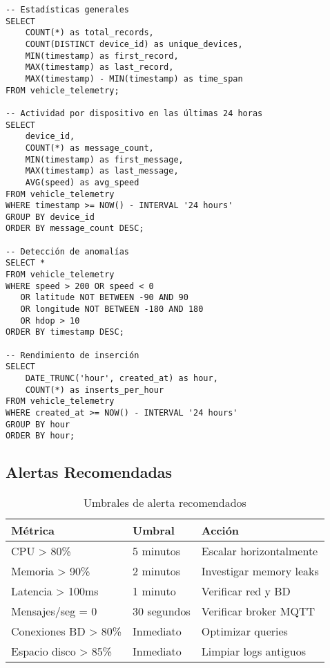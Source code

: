 \begin{verbatim}
-- Estadísticas generales
SELECT 
    COUNT(*) as total_records,
    COUNT(DISTINCT device_id) as unique_devices,
    MIN(timestamp) as first_record,
    MAX(timestamp) as last_record,
    MAX(timestamp) - MIN(timestamp) as time_span
FROM vehicle_telemetry;

-- Actividad por dispositivo en las últimas 24 horas
SELECT 
    device_id,
    COUNT(*) as message_count,
    MIN(timestamp) as first_message,
    MAX(timestamp) as last_message,
    AVG(speed) as avg_speed
FROM vehicle_telemetry 
WHERE timestamp >= NOW() - INTERVAL '24 hours'
GROUP BY device_id
ORDER BY message_count DESC;

-- Detección de anomalías
SELECT *
FROM vehicle_telemetry
WHERE speed > 200 OR speed < 0
   OR latitude NOT BETWEEN -90 AND 90
   OR longitude NOT BETWEEN -180 AND 180
   OR hdop > 10
ORDER BY timestamp DESC;

-- Rendimiento de inserción
SELECT 
    DATE_TRUNC('hour', created_at) as hour,
    COUNT(*) as inserts_per_hour
FROM vehicle_telemetry
WHERE created_at >= NOW() - INTERVAL '24 hours'
GROUP BY hour
ORDER BY hour;
\end{verbatim}

\subsection{Alertas Recomendadas}

\begin{table}[H]
\centering
\begin{tabular}{|p{4cm}|p{3cm}|p{6cm}|}
\hline
\textbf{Métrica} & \textbf{Umbral} & \textbf{Acción} \\
\hline
CPU > 80\% & 5 minutos & Escalar horizontalmente \\
\hline
Memoria > 90\% & 2 minutos & Investigar memory leaks \\
\hline
Latencia > 100ms & 1 minuto & Verificar red y BD \\
\hline
Mensajes/seg = 0 & 30 segundos & Verificar broker MQTT \\
\hline
Conexiones BD > 80\% & Inmediato & Optimizar queries \\
\hline
Espacio disco > 85\% & Inmediato & Limpiar logs antiguos \\
\hline
\end{tabular}
\caption{Umbrales de alerta recomendados}
\label{tab:alertas}
\end{table}
